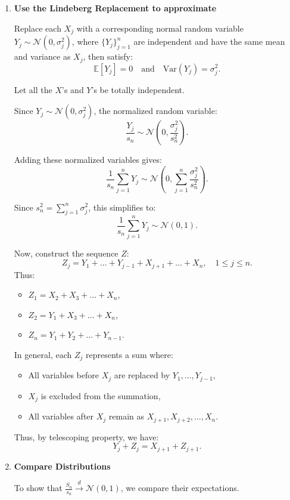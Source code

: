 \begin{itemize}
\begin{enumerate}
\item \textbf{Use the Lindeberg Replacement to approximate}

Replace each \( X_j \) with a corresponding normal random variable \( Y_j \sim \mathcal{N}(0, \sigma_j^2) \), where \( \{Y_j\}_{j=1}^n \) are independent and have the same mean and variance as \( X_j \), then satisfy:
\[
\mathbb{E}[Y_j] = 0 \quad \text{and} \quad \text{Var}(Y_j) = \sigma_j^2.
\]

Let all the \( X\)'s and \( Y\)'s be totally independent. 

Since  \( Y_j \sim \mathcal{N}(0, \sigma_j^2) \), the normalized random variable:
\[
\frac{Y_j}{s_n} \sim \mathcal{N}\left(0, \frac{\sigma_j^2}{s_n^2}\right).
\]

Adding these normalized variables gives:
\[
\frac{1}{s_n} \sum_{j=1}^n Y_j \sim \mathcal{N}\left(0, \sum_{j=1}^n \frac{\sigma_j^2}{s_n^2}\right).
\]

Since \( s_n^2 = \sum_{j=1}^n \sigma_j^2 \), this simplifies to:
\[
\frac{1}{s_n} \sum_{j=1}^n Y_j \sim \mathcal{N}(0, 1).
\]

Now, construct the sequence \( Z\):
\[
Z_j = Y_1 + \dots + Y_{j-1} + X_{j + 1} + \dots + X_n, \quad 1 \leq j \leq n.
\]
Thus:
\begin{itemize}
    \item[] \( Z_1 = X_2 + X_3 + \dots + X_n \),
    \item[] \( Z_2 = Y_1 + X_3 + \dots + X_n \),
    \item[] \( Z_n = Y_1 + Y_2 + \dots + Y_{n-1} \).
\end{itemize}

In general, each \( Z_j \) represents a sum where:
\begin{itemize}
    \item All variables before \( X_j \) are replaced by \( Y_1, \dots, Y_{j-1} \),
    \item \( X_j \) is excluded from the summation,
    \item All variables after \( X_j \) remain as \( X_{j+1}, X_{j+2}, \dots, X_n \).
\end{itemize}

Thus, by telescoping property, we have:
\[
Y_j + Z_j = X_{j+1} + Z_{j+1}.
\]

\item \textbf{Compare Distributions}

To show that \( \frac{S_n}{s_n} \xrightarrow{d} \mathcal{N}(0, 1) \), we compare their expectations. 


\end{enumerate}
\end{itemize}
